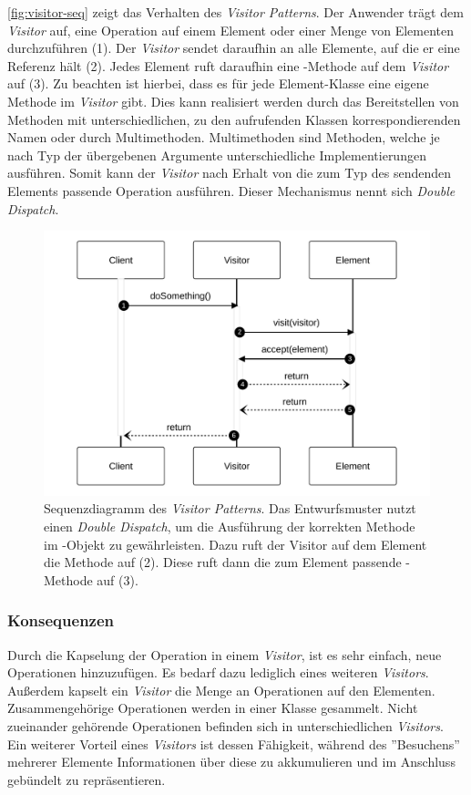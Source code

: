 \autoref{fig:visitor-seq} zeigt das Verhalten des \emph{Visitor Patterns}. Der Anwender trägt dem \emph{Visitor} auf, eine Operation auf einem Element oder einer Menge von Elementen durchzuführen (1). Der \emph{Visitor} sendet daraufhin  an alle Elemente, auf die er eine Referenz hält (2). Jedes Element ruft daraufhin eine -Methode auf dem \emph{Visitor} auf (3). Zu beachten ist hierbei, dass es für jede Element-Klasse eine eigene Methode im \emph{Visitor} gibt. Dies kann realisiert werden durch das Bereitstellen von Methoden mit unterschiedlichen, zu den aufrufenden Klassen korrespondierenden Namen oder durch Multimethoden. Multimethoden sind Methoden, welche je nach Typ der übergebenen Argumente unterschiedliche Implementierungen ausführen. Somit kann der \emph{Visitor} nach Erhalt von  die zum Typ des sendenden Elements passende Operation ausführen. Dieser Mechanismus nennt sich \emph{Double Dispatch}.

\begin{figure}[!ht]
	\centering
	\includegraphics[width=0.75\linewidth]{images/patterns/visitor-seq.pdf}
	\caption{Sequenzdiagramm des \emph{Visitor Patterns}. Das Entwurfsmuster nutzt einen \emph{Double Dispatch}, um die Ausführung der korrekten Methode im -Objekt zu gewährleisten. Dazu ruft der Visitor auf dem Element die Methode  auf (2). Diese ruft dann die zum Element passende -Methode auf (3). \cite{skobeleva_visitor_2023}}
	\label{fig:visitor-seq}
\end{figure}

\subsubsection*{Konsequenzen}
Durch die Kapselung der Operation in einem \emph{Visitor}, ist es sehr einfach, neue Operationen hinzuzufügen. Es bedarf dazu lediglich eines weiteren \emph{Visitors}. Außerdem kapselt ein \emph{Visitor} die Menge an Operationen auf den Elementen. Zusammengehörige Operationen werden in einer Klasse gesammelt. Nicht zueinander gehörende Operationen befinden sich in unterschiedlichen \emph{Visitors}. Ein weiterer Vorteil eines \emph{Visitors} ist dessen Fähigkeit, während des ''Besuchens'' mehrerer Elemente Informationen über diese zu akkumulieren und im Anschluss gebündelt zu repräsentieren.

